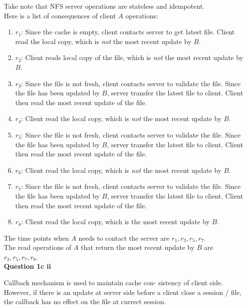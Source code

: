 \documentclass[11pt,a4paper]{report}
\begin{document}
\begin{multicols*}{2}
\noindent Take note that NFS server operations are stateless and idempotent.\\

\noindent Here is a list of consequences of client $A$ operations:
\begin{enumerate}
  \item $r_1$: Since the cache is empty, client contacts server to get latest file. Client read the local copy, which is \emph{not} the most recent update by $B$.
  \item $r_2$: Client reads local copy of the file, which is \emph{not} the most recent update by $B$.
  \item $r_3$: Since the file is not fresh, client contacts server to validate the file. Since the file has been updated by $B$, server transfer the latest file to client. Client then read the most recent update of the file. 
  \item $r_4$: Client read the local copy, which is \emph{not} the most recent update by $B$.
  \item $r_5$: Since the file is not fresh, client contacts server to validate the file. Since the file has been updated by $B$, server transfer the latest file to client. Client then read the most recent update of the file. 
  \item $r_6$: Client read the local copy, which is \emph{not} the most recent update by $B$.
  \item $r_7$: Since the file is not fresh, client contacts server to validate the file. Since the file has been updated by $B$, server transfer the latest file to client. Client then read the most recent update of the file. 
  \item $r_8$: Client read the local copy, which is the most recent update by $B$.
\end{enumerate}

\noindent The time points when $A$ needs to contact the server are $r_1,r_3,r_5,r_7$.\\

\noindent The read operations of $A$ that return the most recent update by $B$ are $r_3,r_5,r_7,r_8$. \\

\noindent \textbf{Question 1c ii}

\noindent Callback mechanism is used to maintain cache con- sistency of client side. However, if there is an update at server side before a client close a session / file, the callback has no effect on the file at currect session. \\


\end{multicols*}
\end{document}

